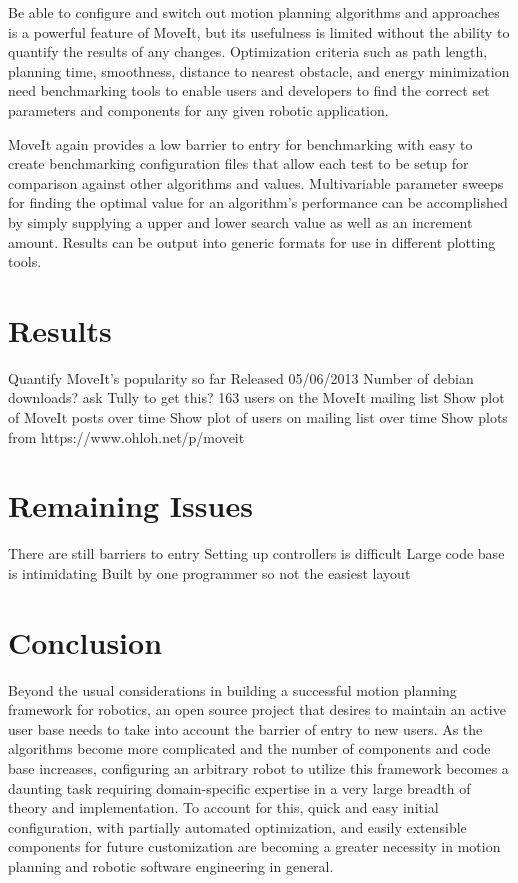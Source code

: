 \documentclass[10pt,journal,compsoc]{joser1}
\begin{document}
{Be able to configure and switch out motion planning algorithms and approaches is a powerful feature of MoveIt, but its usefulness is limited without the ability to quantify the results of any changes. Optimization criteria such as path length, planning time, smoothness, distance to nearest obstacle, and energy minimization need benchmarking tools to enable users and developers to find the correct set parameters and components for any given robotic application.

MoveIt again provides a low barrier to entry for benchmarking with easy to create benchmarking configuration files that allow each test to be setup for comparison against other algorithms and values. Multivariable parameter sweeps for finding the optimal value for an algorithm's performance can be accomplished by simply supplying a upper and lower search value as well as an increment amount. Results can be output into generic formats for use in different plotting tools.

\section{Results}
\label{sec::results}

Quantify MoveIt's popularity so far
Released 05/06/2013
Number of debian downloads? ask Tully to get this?
163 users on the MoveIt mailing list
Show plot of MoveIt posts over time
Show plot of users on mailing list over time
Show plots from https://www.ohloh.net/p/moveit

\section{Remaining Issues}
\label{sec::issues}

There are still barriers to entry
Setting up controllers is difficult
Large code base is intimidating
Built by one programmer so not the easiest layout


\section{Conclusion}
Beyond the usual considerations in building a successful motion planning framework for robotics, an open source project that desires to maintain an active user base needs to take into account the barrier of entry to new users. As the algorithms become more complicated and the number of components and code base increases, configuring an arbitrary robot to utilize this framework becomes a daunting task requiring domain-specific expertise in a very large breadth of theory and implementation. To account for this, quick and easy initial configuration, with partially automated optimization, and easily extensible components for future customization are becoming a greater necessity in motion planning and robotic software engineering in general. 

}
\end{document}
